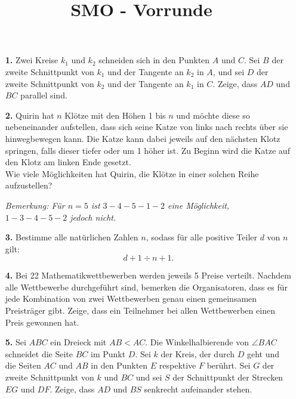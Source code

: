 \documentclass[language=german,style=exam]{smo}
\title{SMO - Vorrunde}
\begin{document}
\begin{enumerate}

\item[\textbf{1.}] 
Zwei Kreise $k_1$ und $k_2$ schneiden sich in den Punkten $A$ und $C$. Sei $B$ der zweite Schnittpunkt von $k_1$ und der Tangente an $k_2$ in $A$, und sei $D$ der zweite Schnittpunkt von $k_2$ und der Tangente an $k_1$ in $C$. Zeige, dass $AD$ und $BC$ parallel sind.

\bigskip

\item[\textbf{2.}] 
Quirin hat $n$ Klötze mit den Höhen 1 bis $n$ und möchte diese so nebeneinander aufstellen, dass sich seine Katze von links nach rechts über sie hinwegbewegen kann. Die Katze kann dabei jeweils auf den nächsten Klotz springen, falls dieser tiefer oder um 1 höher ist. Zu Beginn wird die Katze auf den Klotz am linken Ende gesetzt.\\
Wie viele Möglichkeiten hat Quirin, die Klötze in einer solchen Reihe aufzustellen?

\textit{Bemerkung: Für $n=5$ ist $3-4-5-1-2$ eine Möglichkeit, $1-3-4-5-2$ jedoch nicht.} 

\bigskip

\item[\textbf{3.}]
Bestimme alle natürlichen Zahlen $n$, sodass für alle positive Teiler $d$ von $n$ gilt:
\[
d+1 \div n+1.
\]

\bigskip

\item[\textbf{4.}] 
Bei 22 Mathematikwettbewerben werden jeweils 5 Preise verteilt. Nachdem alle Wettbewerbe durchgeführt sind, bemerken die Organisatoren, dass es für jede Kombination von zwei Wett\-bewer\-ben genau einen gemeinsamen Preisträger gibt. Zeige, dass ein Teilnehmer bei allen Wettbe\-wer\-ben einen Preis gewonnen hat.

\bigskip

\item[\textbf{5.}] 
Sei $ABC$ ein Dreieck mit $AB < AC$. Die Winkelhalbierende von $\angle BAC$ schneidet die Seite $BC$ im Punkt $D$. Sei $k$ der Kreis, der durch $D$ geht und die Seiten $AC$ und $AB$ in den Punkten $E$ respektive $F$ berührt. Sei $G$ der zweite Schnittpunkt von $k$ und $BC$ und sei $S$ der Schnittpunkt der Strecken $EG$ und $DF$. Zeige, dass $AD$ und $BS$ senkrecht aufeinander stehen.

\bigskip

\end{enumerate}

\vspace{1cm}

\end{document}
